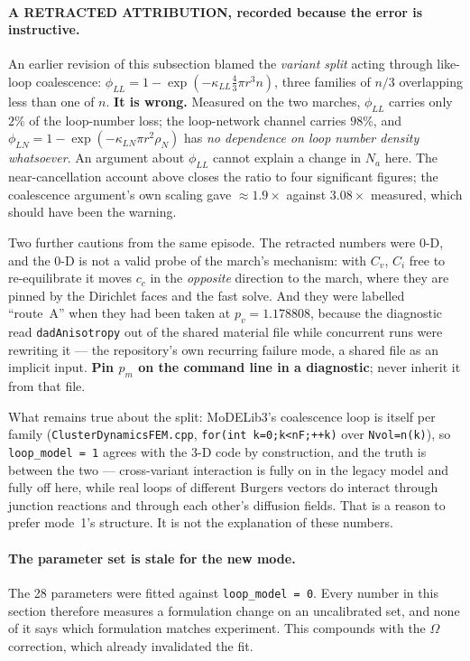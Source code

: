 \documentclass[11pt,a4paper]{article}
\newcommand{\code}[1]{\texttt{\small #1}}
\begin{document}
\paragraph{A RETRACTED ATTRIBUTION, recorded because the error is instructive.}
An earlier revision of this subsection blamed the \emph{variant split} acting
through like-loop coalescence: $\phi_{LL} = 1 - \exp(-\kappa_{LL}\tfrac43\pi
r^3 n)$, three families of $n/3$ overlapping less than one of $n$. \textbf{It is
wrong.} Measured on the two marches, $\phi_{LL}$ carries only $2\%$ of the
loop-number loss; the loop-network channel carries $98\%$, and
$\phi_{LN} = 1 - \exp(-\kappa_{LN}\pi r^2\rho_N)$ has \emph{no dependence on
loop number density whatsoever}. An argument about $\phi_{LL}$ cannot explain a
change in $N_a$ here. The near-cancellation account above closes the ratio to
four significant figures; the coalescence argument's own scaling gave
$\approx 1.9\times$ against $3.08\times$ measured, which should have been the
warning.

Two further cautions from the same episode. The retracted numbers were 0-D, and
the 0-D is not a valid probe of the march's mechanism: with $C_v$, $C_i$ free to
re-equilibrate it moves $c_c$ in the \emph{opposite} direction to the march,
where they are pinned by the Dirichlet faces and the fast solve. And they were
labelled ``route~A'' when they had been taken at $p_v = 1.178808$, because the
diagnostic read \code{dadAnisotropy} out of the shared material file while
concurrent runs were rewriting it --- the repository's own recurring failure
mode, a shared file as an implicit input. \textbf{Pin $p_m$ on the command line
in a diagnostic}; never inherit it from that file.

What remains true about the split: MoDELib3's coalescence loop is itself per
family (\code{ClusterDynamicsFEM.cpp}, \code{for(int k=0;k<nF;++k)} over
\code{Nvol=n(k)}), so \code{loop\_model = 1} agrees with the 3-D code by
construction, and the truth is between the two --- cross-variant interaction is
fully on in the legacy model and fully off here, while real loops of different
Burgers vectors do interact through junction reactions and through each other's
diffusion fields. That is a reason to prefer mode~1's structure. It is not the
explanation of these numbers.

\paragraph{The parameter set is stale for the new mode.} The 28 parameters were
fitted against \code{loop\_model = 0}. Every number in this section therefore
measures a formulation change on an uncalibrated set, and none of it says which
formulation matches experiment. This compounds with the $\Omega$ correction,
which already invalidated the fit.
\end{document}

